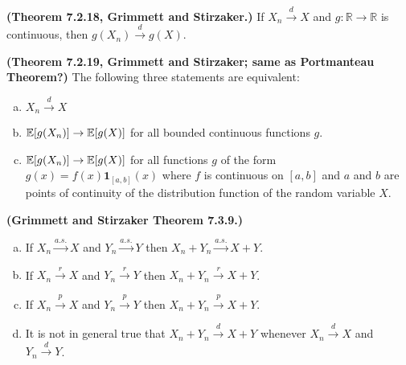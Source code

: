 \begin{theorem}\textbf{(Theorem 7.2.18, Grimmett and Stirzaker.)} If \(X_n \xrightarrow{d} X\) and \(g: \mathbb{R} \to \mathbb{R}\) is continuous, then \(g(X_n) \xrightarrow{d} g(X)\). \end{theorem}

\begin{theorem}\textbf{(Theorem 7.2.19, Grimmett and Stirzaker; same as Portmanteau Theorem?)} The following three statements are equivalent:

\begin{enumerate}[(a)]

\item \(X_n \xrightarrow{d} X\)

\item \(\mathbb{E}[g(X_n)] \to \mathbb{E}[g(X)]\) for all bounded continuous functions \(g\).

\item \(\mathbb{E}[g(X_n)] \to \mathbb{E}[g(X)]\) for all functions \(g\) of the form \(g(x) = f(x) \boldsymbol{1}_{[a, b]}(x)\) where \(f\) is continuous on \([a, b]\) and \(a\) and \(b\) are points of continuity of the distribution function of the random variable \(X\). 

\end{enumerate}
\end{theorem}

\begin{theorem}\textbf{(Grimmett and Stirzaker Theorem 7.3.9.)} 
\begin{enumerate}[(a)]

\item If \(X_n \xrightarrow{a.s.} X\) and \(Y_n \xrightarrow{a.s.} Y\) then \(X_n + Y_n \xrightarrow{a.s.} X + Y\).

\item If \(X_n \xrightarrow{r} X\) and \(Y_n \xrightarrow{r} Y\) then \(X_n + Y_n \xrightarrow{r} X + Y\).

\item If \(X_n \xrightarrow{p} X\) and \(Y_n \xrightarrow{p} Y\) then \(X_n + Y_n \xrightarrow{p} X + Y\).

\item It is not in general true that  \(X_n + Y_n \xrightarrow{d} X + Y\) whenever  \(X_n \xrightarrow{d} X\) and \(Y_n \xrightarrow{d} Y\).

\end{enumerate}
\end{theorem}

